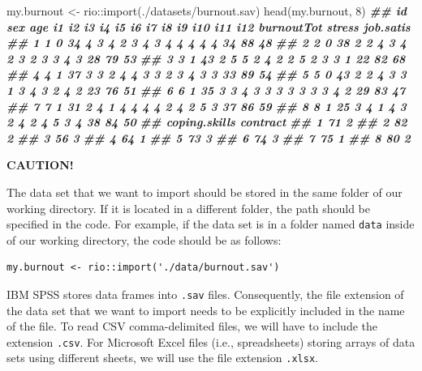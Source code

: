 \documentclass[
]{book}
\newenvironment{Shaded}{\begin{snugshade}}{\end{snugshade}}
\newcommand{\DecValTok}[1]{\textcolor[rgb]{0.00,0.00,0.81}{#1}}
\newcommand{\DocumentationTok}[1]{\textcolor[rgb]{0.56,0.35,0.01}{\textbf{\textit{#1}}}}
\newcommand{\FunctionTok}[1]{\textcolor[rgb]{0.00,0.00,0.00}{#1}}
\newcommand{\NormalTok}[1]{#1}
\newcommand{\OtherTok}[1]{\textcolor[rgb]{0.56,0.35,0.01}{#1}}
\newcommand{\SpecialCharTok}[1]{\textcolor[rgb]{0.00,0.00,0.00}{#1}}
\newcommand{\StringTok}[1]{\textcolor[rgb]{0.31,0.60,0.02}{#1}}
\theoremstyle{definition}
\theoremstyle{definition}
\theoremstyle{definition}
\theoremstyle{definition}
\theoremstyle{remark}
\begin{document}
\begin{Shaded}
\begin{Highlighting}[]

\NormalTok{my.burnout }\OtherTok{\textless{}{-}}\NormalTok{ rio}\SpecialCharTok{::}\FunctionTok{import}\NormalTok{(}\StringTok{\textquotesingle{}./datasets/burnout.sav\textquotesingle{}}\NormalTok{)}
\FunctionTok{head}\NormalTok{(my.burnout, }\DecValTok{8}\NormalTok{)}
\DocumentationTok{\#\#   id sex age i1 i2 i3 i4 i5 i6 i7 i8 i9 i10 i11 i12 burnoutTot stress job.satis}
\DocumentationTok{\#\# 1  1   0  34  4  3  4  2  3  4  3  4  4   4   4   4         34     88        48}
\DocumentationTok{\#\# 2  2   0  38  2  2  4  3  4  2  3  2  3   3   4   3         28     79        53}
\DocumentationTok{\#\# 3  3   1  43  2  5  5  2  4  2  2  5  2   3   3   1         22     82        68}
\DocumentationTok{\#\# 4  4   1  37  3  3  2  4  4  3  3  2  3   4   3   3         33     89        54}
\DocumentationTok{\#\# 5  5   0  43  2  2  4  3  3  1  3  4  3   2   4   2         23     76        51}
\DocumentationTok{\#\# 6  6   1  35  3  3  4  3  3  3  3  3  3   3   4   2         29     83        47}
\DocumentationTok{\#\# 7  7   1  31  2  4  1  4  4  4  4  2  4   2   5   3         37     86        59}
\DocumentationTok{\#\# 8  8   1  25  3  4  1  4  3  2  4  2  4   5   3   4         38     84        50}
\DocumentationTok{\#\#   coping.skills contract}
\DocumentationTok{\#\# 1            71        2}
\DocumentationTok{\#\# 2            82        2}
\DocumentationTok{\#\# 3            56        3}
\DocumentationTok{\#\# 4            64        1}
\DocumentationTok{\#\# 5            73        3}
\DocumentationTok{\#\# 6            74        3}
\DocumentationTok{\#\# 7            75        1}
\DocumentationTok{\#\# 8            80        2}
\end{Highlighting}
\end{Shaded}

\textbf{CAUTION!}

The data set that we want to import should be stored in the same folder of our working directory. If it is located in a different folder, the path should be specified in the code. For example, if the data set is in a folder named \texttt{data} inside of our working directory, the code should be as follows:

\begin{verbatim}
my.burnout <- rio::import('./data/burnout.sav')
\end{verbatim}

IBM SPSS stores data frames into \texttt{.sav} files. Consequently, the file extension of the data set that we want to import needs to be explicitly included in the name of the file. To read CSV comma-delimited files, we will have to include the extension \texttt{.csv}. For Microsoft Excel files (i.e., spreadsheets) storing arrays of data sets using different sheets, we will use the file extension \texttt{.xlsx}.
\end{document}

